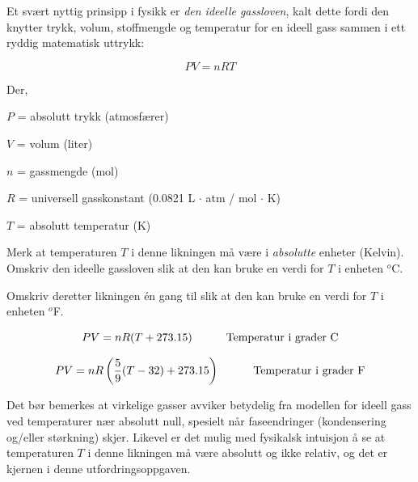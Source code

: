 
Et svært nyttig prinsipp i fysikk er \textit{den ideelle gassloven}, kalt dette fordi den knytter trykk, volum, stoffmengde og temperatur for en ideell gass sammen i ett ryddig matematisk uttrykk:

$$PV = nRT$$

\noindent
Der,

$P$ = absolutt trykk (atmosfærer)

$V$ = volum (liter)

$n$ = gassmengde (mol)

$R$ = universell gasskonstant (0.0821 L $\cdot$ atm / mol $\cdot$ K)

$T$ = absolutt temperatur (K)

\vskip 10pt

Merk at temperaturen $T$ i denne likningen må være i \textit{absolutte} enheter (Kelvin). Omskriv den ideelle gassloven slik at den kan bruke en verdi for $T$ i enheten $^{o}$C.

Omskriv deretter likningen én gang til slik at den kan bruke en verdi for $T$ i enheten $^{o}$F.







$$PV = nR(T + 273.15) \hbox{\hskip 30pt Temperatur i grader C}$$

$$PV = nR\left({5 \over 9}(T - 32) + 273.15\right) \hbox{\hskip 30pt Temperatur i grader F}$$

Det bør bemerkes at virkelige gasser avviker betydelig fra modellen for ideell gass ved temperaturer nær absolutt null, spesielt når faseendringer (kondensering og/eller størkning) skjer. Likevel er det mulig med fysikalsk intuisjon å se at temperaturen $T$ i denne likningen må være absolutt og ikke relativ, og det er kjernen i denne utfordringsoppgaven.









